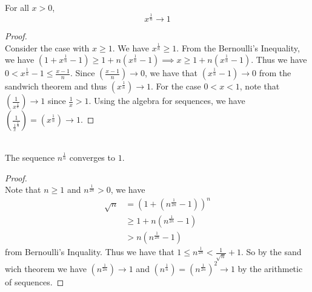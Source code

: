 \documentclass[a4paper]{article}
\begin{document}
\begin{thm}{}{}\\ For all $x>0$, $$x^{\frac{1}{n}}\to 1$$ 
\begin{proof}\\ Consider the case with $x\geq1$. We have $x^\frac{1}{n}\geq1$. From the Bernoulli's Inequality, we have $\left(1+x^\frac{1}{n}-1\right)\geq1+n\left(x^\frac{1}{n}-1\right)\implies x\geq1+n\left(x^\frac{1}{n}-1\right)$.  Thus we have $0<x^\frac{1}{n}-1\leq\frac{x-1}{n}$. Since $\left(\frac{x-1}{n}\right)\to0$, we have that $\left(x^\frac{1}{n}-1\right)\to0$ from the sandwich theorem and thus $\left(x^\frac{1}{n}\right)\to1$. For the case $0<x<1$, note that $\left(\frac{1}{x^\frac{1}{n}}\right)\to1$ since $\frac{1}{x}>1$. Using the algebra for sequences, we have $\left(\frac{1}{\frac{1}{x}^{\frac{1}{n}}}\right)=\left(x^\frac{1}{n}\right)\to1$. 
\end{proof}
\end{thm}

\begin{thm}{}{}\\ The sequence $n^{\frac{1}{n}}$ converges to $1$. 
\begin{proof}\\ Note that $n\geq1$ and $n^\frac{1}{2n}>0$, we have 
\begin{align*}
\sqrt{n}&=(1+(n^\frac{1}{2n}-1))^n \\
&\geq1+n(n^\frac{1}{2n}-1) \\
&>n(n^\frac{1}{2n}-1)
\end{align*}
from Bernoulli's Inquality. Thus we have that $1\leq n^\frac{1}{2n}<\frac{1}{\sqrt{n}}+1$. So by the sand wich theorem we have $(n^\frac{1}{2n})\to1$ and $(n^\frac{1}{n})=(n^\frac{1}{2n})^2\to1$ by the arithmetic of sequences. 
\end{proof}
\end{thm}
\end{document}

